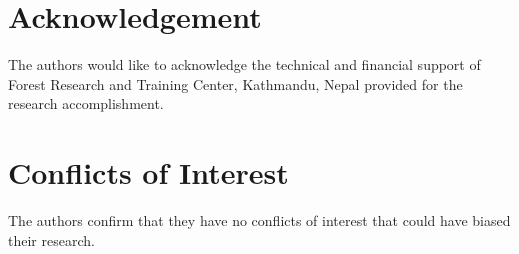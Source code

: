 \documentclass[preprint, 3p,
authoryear]{elsarticle} %
\begin{document}
\hypertarget{acknowledgement}{%
\section{Acknowledgement}\label{acknowledgement}}

The authors would like to acknowledge the technical and financial
support of Forest Research and Training Center, Kathmandu, Nepal
provided for the research accomplishment.

\hypertarget{conflicts-of-interest}{%
\section{Conflicts of Interest}\label{conflicts-of-interest}}

The authors confirm that they have no conflicts of interest that could
have biased their research.


\end{document}
